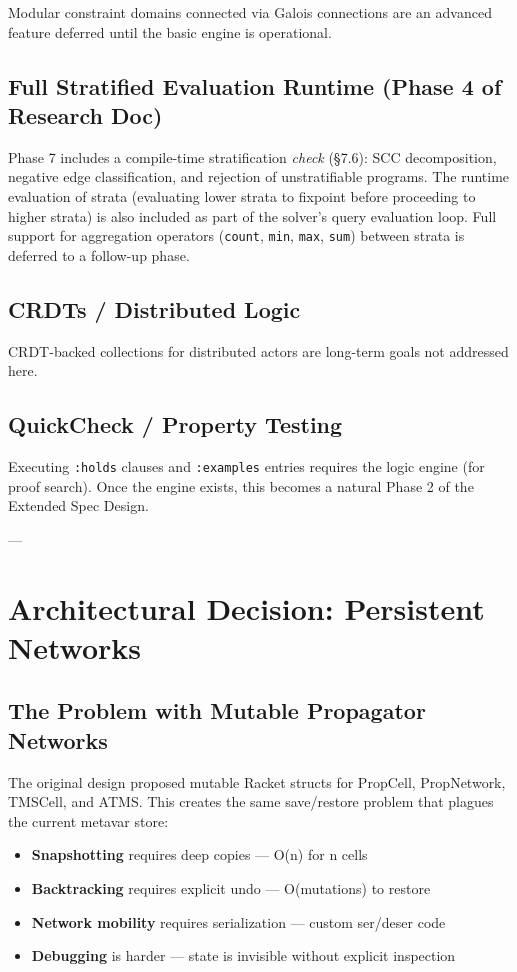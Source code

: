 \documentclass[11pt]{article}
\begin{document}
Modular constraint domains connected via Galois connections are an advanced
feature deferred until the basic engine is operational.
\subsection{Full Stratified Evaluation Runtime (Phase 4 of Research Doc)}
\label{sec:orgdf4c4c9}

Phase 7 includes a compile-time stratification \emph{check} (§7.6): SCC decomposition,
negative edge classification, and rejection of unstratifiable programs. The
runtime evaluation of strata (evaluating lower strata to fixpoint before
proceeding to higher strata) is also included as part of the solver's query
evaluation loop. Full support for aggregation operators (\texttt{count}, \texttt{min}, \texttt{max},
\texttt{sum}) between strata is deferred to a follow-up phase.
\subsection{CRDTs / Distributed Logic}
\label{sec:org8825398}

CRDT-backed collections for distributed actors are long-term goals not
addressed here.
\subsection{QuickCheck / Property Testing}
\label{sec:orgf8ffaad}

Executing \texttt{:holds} clauses and \texttt{:examples} entries requires the logic engine
(for proof search). Once the engine exists, this becomes a natural Phase 2
of the Extended Spec Design.

---
\section{Architectural Decision: Persistent Networks}
\label{sec:orgbca97aa}

\subsection{The Problem with Mutable Propagator Networks}
\label{sec:org1df1365}

The original design proposed mutable Racket structs for PropCell, PropNetwork,
TMSCell, and ATMS. This creates the same save/restore problem that plagues
the current metavar store:

\begin{itemize}
\item \textbf{Snapshotting} requires deep copies — O(n) for n cells
\item \textbf{Backtracking} requires explicit undo — O(mutations) to restore
\item \textbf{Network mobility} requires serialization — custom ser/deser code
\item \textbf{Debugging} is harder — state is invisible without explicit inspection
\end{itemize}
\end{document}
